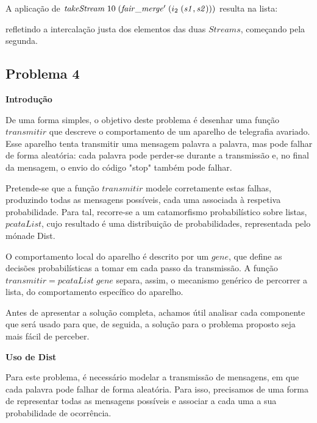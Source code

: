 \documentclass[11pt, a4paper, fleqn]{article}
\newcommand{\Conid}[1]{\mathit{#1}}
\newcommand{\Varid}[1]{\mathit{#1}}
\def\resethooks{%
  \global\let\SaveRestoreHook\empty
  \global\let\ColumnHook\empty}
\let\hspre\empty
\let\hspost\empty
\begin{document}
A aplicação de \ensuremath{\Varid{takeStream}\;\mathrm{10}\;(\Varid{fair\char95 merge'}\;(i_2\;(\Varid{s1},\Varid{s2})))} resulta na lista:
\resethooks
refletindo a intercalação justa dos elementos das duas \ensuremath{\Conid{Streams}}, 
começando pela segunda.
\subsection*{Problema 4}

\textbf{Introdução}

De uma forma simples, o objetivo deste problema é desenhar uma função \ensuremath{\Varid{transmitir}} que descreve o comportamento de um aparelho de telegrafia avariado. Esse aparelho tenta transmitir uma mensagem palavra a palavra, mas pode falhar de forma aleatória: cada palavra pode perder-se durante a transmissão e, no final da mensagem, o envio do código "stop" também pode falhar.

Pretende-se que a função \ensuremath{\Varid{transmitir}} modele corretamente estas falhas, produzindo todas as mensagens possíveis, cada uma associada à respetiva probabilidade. Para tal, recorre-se a um catamorfismo probabilístico sobre listas, \ensuremath{\Varid{pcataList}}, cujo resultado é uma distribuição de probabilidades, representada pelo mónade Dist.

O comportamento local do aparelho é descrito por um \ensuremath{\Varid{gene}}, que define as decisões probabilísticas a tomar em cada passo da transmissão. A função \ensuremath{\Varid{transmitir}\mathrel{=}\Varid{pcataList}\;\Varid{gene}} separa, assim, o mecanismo genérico de percorrer a lista, do comportamento específico do aparelho.

Antes de apresentar a solução completa, achamos útil analisar cada componente que será usado para que, de seguida, a solução para o problema proposto seja mais fácil de perceber.

\textbf{Uso de Dist}

Para este problema, é necessário modelar a transmissão de mensagens, em que cada palavra pode falhar de forma aleatória. Para isso, precisamos de uma forma de representar todas as mensagens possíveis e associar a cada uma a sua probabilidade de ocorrência.
\end{document}
